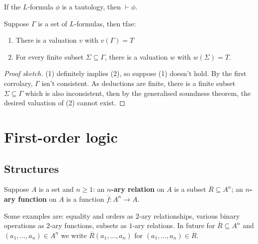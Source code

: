 \documentclass{article}
\begin{document}
\begin{corollary}[Completeness of $L$]
    If the $L$-formula $\phi$ is a tautology, then $\vdash\phi$.
\end{corollary}

\begin{theorem}
    Suppose $\Gamma$ is a set of $L$-formulas, then tfae:\begin{enumerate}
        \item There is a valuation $v$ with $v(\Gamma)=T$
        \item For every finite subset $\Sigma\subseteq \Gamma$, there is a valuation $w$ with $w(\Sigma)=T$.
    \end{enumerate}
    \begin{proof}[Proof sketch]
        (1) definitely implies (2), so suppose (1) doesn't hold. By the first corrolary, $\Gamma$ isn't consistent. As deductions are finite, there is a finite subset $\Sigma\subseteq \Gamma$ which is also inconsistent, then by the generalised soundness theorem, the desired valuation of (2) cannot exist.
    \end{proof}
\end{theorem}

\section{First-order logic}

\subsection{Structures}

\begin{definition}
    Suppose $A$ is a set and $n\geq 1$: an \textbf{$n$-ary relation} on $A$ is a subset $\overline{R}\subseteq A^n$; an \textbf{$n$-ary function} on $A$ is a function $\overline{f}:A^n\rightarrow A$.
\end{definition}

Some examples are: equality and orders as $2$-ary relationships, various binary operations as $2$-ary functions, subsets as $1$-ary relations. In future for $\overline{R}\subseteq A^n$ and $(a_1,\ldots,a_n)\in A^n$ we write $\overline{R}(a_1,\ldots,a_n)$ for $(a_1,\ldots,a_n)\in\overline{R}$.
\end{document}
